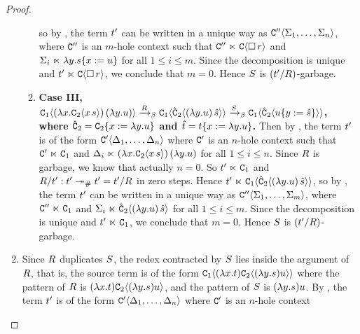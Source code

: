 \begin{proof}
\begin{enumerate}
\begin{enumerate}
    so by , the term $t'$ can be written in a unique way as
    $\mathtt{C}''\langle\Sigma_1,\hdots,\Sigma_n\rangle$, where $\mathtt{C}''$ is an $m$-hole context such that
    $\mathtt{C}'' \mathrel{\ltimes} \mathtt{C}\langle\Box\,r\rangle$ and $\Sigma_i \mathrel{\ltimes} \lambda y. s\{x := u\}$
    for all $1 \leq i \leq m$.
    Since the decomposition is unique and $t' \mathrel{\ltimes} \mathtt{C}\langle\Box\,r\rangle$,
    we conclude that $m = 0$.
    Hence $S$ is $(t'/R)$-garbage.
  \item {\bf Case III, $
         \mathtt{C}_1\langle(\lambda x. \mathtt{C}_2\langle x\,s\rangle)\,(\lambda y. u)\rangle
       \mathrel{\xrightarrow{R}_\beta}
         \mathtt{C}_1\langle\hat{\mathtt{C}}_2\langle(\lambda y. u)\,\hat{s}\rangle\rangle
       \mathrel{\xrightarrow{S}_\beta}
         \mathtt{C}_1\langle\hat{\mathtt{C}}_2\langle u\{y := \hat{s}\}\rangle\rangle
      $,
      where
        $\hat{\mathtt{C}}_2 = \mathtt{C}_2\{x := \lambda y. u\}$
      and
        $\hat{t} = t\{x := \lambda y. u\}$.}
    Then by ,
    the term $t'$ is of the form $\mathtt{C}'\langle\Delta_1,\hdots,\Delta_n\rangle$
    where $\mathtt{C}'$ is an $n$-hole context such that $\mathtt{C}' \mathrel{\ltimes} \mathtt{C}_1$
    and $\Delta_i \mathrel{\ltimes} (\lambda x. \mathtt{C}_2\langle x\,s\rangle)\,(\lambda y. u)$ for all $1 \leq i \leq n$.
    Since $R$ is garbage, we know that actually $n = 0$.
    So $t' \mathrel{\ltimes} \mathtt{C}_1$ and $R/t' : t' \mathrel{\twoheadrightarrow_{\mathtt{\#}}} t' = t'/R$ in zero steps.
    Hence $t' \mathrel{\ltimes} \mathtt{C}_1\langle\hat{\mathtt{C}}_2\langle(\lambda y. u)\,\hat{s}\rangle\rangle$,
    so by , the term $t'$ can be written in a unique way as
    $\mathtt{C}''\langle\Sigma_1,\hdots,\Sigma_m\rangle$, where $\mathtt{C}'' \mathrel{\ltimes} \mathtt{C}_1$ and
    $\Sigma_i \mathrel{\ltimes} \hat{\mathtt{C}}_2\langle(\lambda y. u)\,\hat{s}\rangle$ for all $1 \leq i \leq m$.
    Since the decomposition is unique and $t' \mathrel{\ltimes} \mathtt{C}_1$, we conclude that $m = 0$.
    Hence $S$ is $(t'/R)$-garbage.
  \end{enumerate}
\item
  Since $R$ duplicates $S$,
  the redex contracted by $S$ 
  lies inside the argument of $R$, that is,
  the source term is of the form $\mathtt{C}_1\langle(\lambda x. t)\mathtt{C}_2\langle(\lambda y. s)u\rangle\rangle$
  where the pattern of $R$ is $(\lambda x. t)\mathtt{C}_2\langle(\lambda y. s)u\rangle$,
  and the pattern of $S$ is $(\lambda y. s)u$.
  By ,
  the term $t'$ is of the form $\mathtt{C}'\langle\Delta_1,\hdots,\Delta_n\rangle$
  where $\mathtt{C}'$ is an $n$-hole context

\end{enumerate}
\end{proof}

